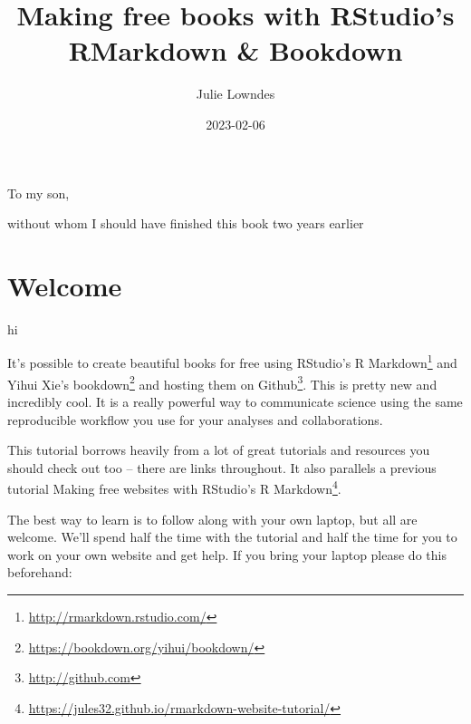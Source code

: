 \documentclass[
]{book}
\title{Making free books with RStudio's RMarkdown \& Bookdown}
\author{Julie Lowndes}
\date{2023-02-06}
\renewcommand{\href}[2]{#2\footnote{\url{#1}}}
\begin{document}
\maketitle


\thispagestyle{empty}

\begin{center}
To my son,

without whom I should have finished this book two years earlier
\end{center}

\setlength{\abovedisplayskip}{-5pt}
\setlength{\abovedisplayshortskip}{-5pt}

{
\setcounter{tocdepth}{2}
\tableofcontents
}
\hypertarget{welcome}{%
\chapter{Welcome}\label{welcome}}

hi

It's possible to create beautiful books for free using \href{http://rmarkdown.rstudio.com/}{RStudio's R Markdown} and Yihui Xie's \href{https://bookdown.org/yihui/bookdown/}{bookdown} and hosting them on \href{http://github.com}{Github}. This is pretty new and incredibly cool. It is a really powerful way to communicate science using the same reproducible workflow you use for your analyses and collaborations.

This tutorial borrows heavily from a lot of great tutorials and resources you should check out too -- there are links throughout. It also parallels a previous tutorial \href{https://jules32.github.io/rmarkdown-website-tutorial/}{Making free websites with RStudio's R Markdown}.

The best way to learn is to follow along with your own laptop, but all are welcome. We'll spend half the time with the tutorial and half the time for you to work on your own website and get help. If you bring your laptop please do this beforehand:
\end{document}
